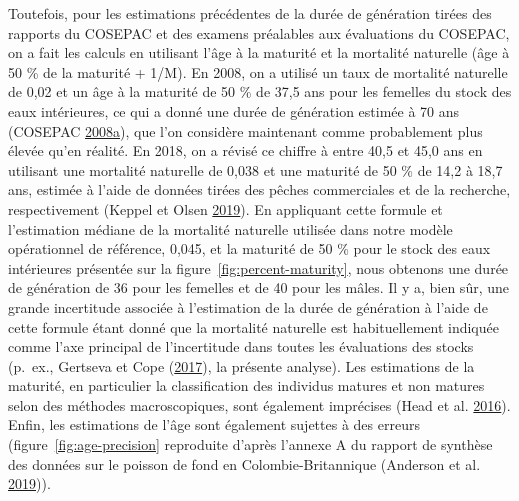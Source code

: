 \documentclass[french,11pt]{book}
\begin{document}
Toutefois, pour les estimations précédentes de la durée de génération tirées des rapports du COSEPAC et des examens préalables aux évaluations du COSEPAC, on a fait les calculs en utilisant l'âge à la maturité et la mortalité naturelle (âge à 50 \% de la maturité + 1/M). En 2008, on a utilisé un taux de mortalité naturelle de 0,02 et un âge à la maturité de 50 \% de 37,5 ans pour les femelles du stock des eaux intérieures, ce qui a donné une durée de génération estimée à 70 ans (COSEPAC \protect\hyperlink{ref-cosewic2008}{2008}\protect\hyperlink{ref-cosewic2008}{a}), que l'on considère maintenant comme probablement plus élevée qu'en réalité. En 2018, on a révisé ce chiffre à entre 40,5 et 45,0 ans en utilisant une mortalité naturelle de 0,038 et une maturité de 50 \% de 14,2 à 18,7 ans, estimée à l'aide de données tirées des pêches commerciales et de la recherche, respectivement (Keppel et Olsen \protect\hyperlink{ref-keppel2019}{2019}). En appliquant cette formule et l'estimation médiane de la mortalité naturelle utilisée dans notre modèle opérationnel de référence, 0,045, et la maturité de 50 \% pour le stock des eaux intérieures présentée sur la figure~\ref{fig:percent-maturity}, nous obtenons une durée de génération de 36 pour les femelles et de 40 pour les mâles. Il y a, bien sûr, une grande incertitude associée à l'estimation de la durée de génération à l'aide de cette formule étant donné que la mortalité naturelle est habituellement indiquée comme l'axe principal de l'incertitude dans toutes les évaluations des stocks (p.~ex., Gertseva et Cope (\protect\hyperlink{ref-gertseva2017}{2017}), la présente analyse). Les estimations de la maturité, en particulier la classification des individus matures et non matures selon des méthodes macroscopiques, sont également imprécises (Head et al. \protect\hyperlink{ref-head2016}{2016}). Enfin, les estimations de l'âge sont également sujettes à des erreurs (figure~\ref{fig:age-precision} reproduite d'après l'annexe A du rapport de synthèse des données sur le poisson de fond en Colombie-Britannique (Anderson et al. \protect\hyperlink{ref-anderson2019synopsis}{2019})).

\clearpage
\end{document}
